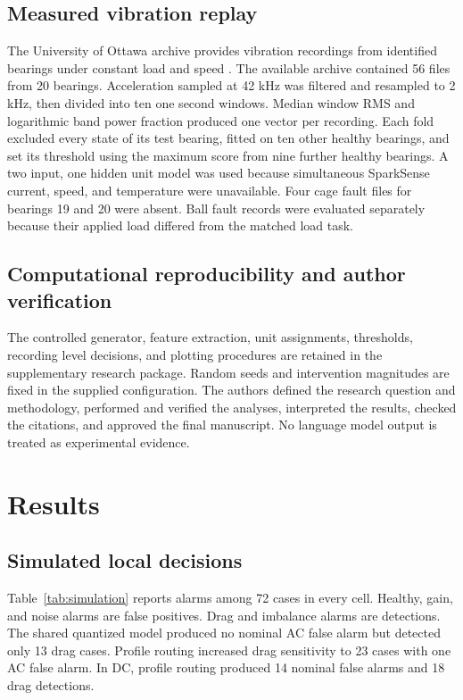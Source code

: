 \documentclass[10pt,twocolumn]{article}
\begin{document}
\subsection{Measured vibration replay}
The University of Ottawa archive provides vibration recordings from identified bearings under constant load and speed \cite{sehri2023data,sehri2023dataset}. The available archive contained 56 files from 20 bearings. Acceleration sampled at 42 kHz was filtered and resampled to 2 kHz, then divided into ten one second windows. Median window RMS and logarithmic band power fraction produced one vector per recording. Each fold excluded every state of its test bearing, fitted on ten other healthy bearings, and set its threshold using the maximum score from nine further healthy bearings. A two input, one hidden unit model was used because simultaneous SparkSense current, speed, and temperature were unavailable. Four cage fault files for bearings 19 and 20 were absent. Ball fault records were evaluated separately because their applied load differed from the matched load task.

\subsection{Computational reproducibility and author verification}
The controlled generator, feature extraction, unit assignments, thresholds, recording level decisions, and plotting procedures are retained in the supplementary research package. Random seeds and intervention magnitudes are fixed in the supplied configuration. The authors defined the research question and methodology, performed and verified the analyses, interpreted the results, checked the citations, and approved the final manuscript. No language model output is treated as experimental evidence.

\section{Results}
\subsection{Simulated local decisions}
Table~\ref{tab:simulation} reports alarms among 72 cases in every cell. Healthy, gain, and noise alarms are false positives. Drag and imbalance alarms are detections. The shared quantized model produced no nominal AC false alarm but detected only 13 drag cases. Profile routing increased drag sensitivity to 23 cases with one AC false alarm. In DC, profile routing produced 14 nominal false alarms and 18 drag detections.
\end{document}
